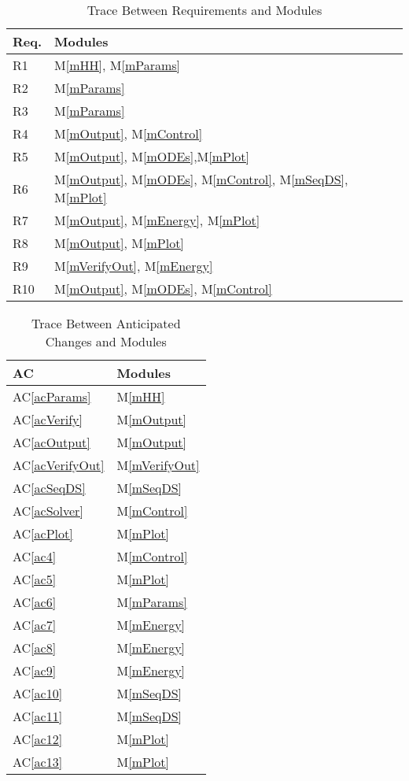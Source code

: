 \documentclass[12pt]{article}
\newcommand{\acref}[1]{AC\ref{#1}}
\newcommand{\mref}[1]{M\ref{#1}}
\begin{document}
\begin{table}[H]
\centering
\begin{tabular}{p{} p{}}
\toprule
\textbf{Req.} & \textbf{Modules}\\
\midrule
R1 & \mref{mHH}, \mref{mParams}\\ %
R2 & \mref{mParams}\\ %
R3 & \mref{mParams}\\ %
R4 & \mref{mOutput}, \mref{mControl}\\
R5 & \mref{mOutput}, \mref{mODEs},\mref{mPlot}\\
R6 & \mref{mOutput}, \mref{mODEs}, \mref{mControl}, \mref{mSeqDS}, \mref{mPlot}\\
R7 & \mref{mOutput}, \mref{mEnergy}, \mref{mPlot}\\
R8 & \mref{mOutput}, \mref{mPlot}\\
R9 & \mref{mVerifyOut}, \mref{mEnergy}\\
R10 & \mref{mOutput}, \mref{mODEs}, \mref{mControl}\\
\bottomrule
\end{tabular}
\caption{Trace Between Requirements and Modules}
\label{TblRT}
\end{table}

\begin{table}[H]
\centering
\begin{tabular}{p{} p{}}
\toprule
\textbf{AC} & \textbf{Modules}\\
\midrule


\acref{acParams} & \mref{mHH}\\
\acref{acVerify} & \mref{mOutput}\\ %
\acref{acOutput} & \mref{mOutput}\\
\acref{acVerifyOut} & \mref{mVerifyOut}\\
\acref{acSeqDS} & \mref{mSeqDS}\\
\acref{acSolver} & \mref{mControl}\\
\acref{acPlot} & \mref{mPlot}\\
\acref{ac4} & \mref{mControl}\\
\acref{ac5} & \mref{mPlot}\\
\acref{ac6} & \mref{mParams}\\
\acref{ac7} & \mref{mEnergy}\\
\acref{ac8} & \mref{mEnergy}\\
\acref{ac9} & \mref{mEnergy}\\
\acref{ac10} & \mref{mSeqDS}\\
\acref{ac11} & \mref{mSeqDS}\\
\acref{ac12} & \mref{mPlot}\\
\acref{ac13} & \mref{mPlot}\\

\bottomrule
\end{tabular}
\caption{Trace Between Anticipated Changes and Modules}
\label{TblACT}
\end{table}
\end{document}
